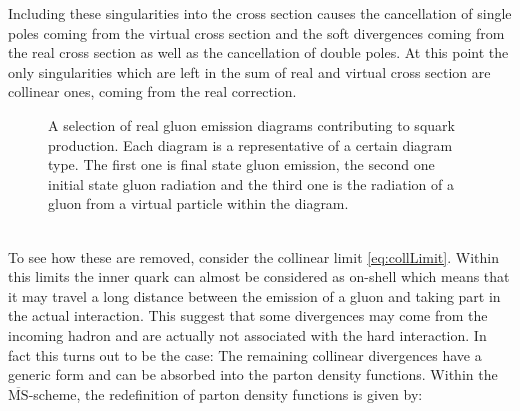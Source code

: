Including these singularities into the cross section causes the cancellation of single poles coming from the virtual cross section and the soft divergences coming from the real cross section as well as the cancellation of double poles. At this point the only singularities which are left in the sum of real and virtual cross section are collinear ones, coming from the real correction.
\begin{figure}[!htbp]
\begin{center}
\caption{A selection of real gluon emission diagrams contributing to squark production. Each diagram is a representative of a certain diagram type. The first one is final state gluon emission, the second one initial state gluon radiation and the third one is the radiation of a gluon from a virtual particle within the diagram.}\label{fig:RealGluon}
\end{center}
\end{figure}\\
To see how these are removed, consider the collinear limit \eqref{eq:collLimit}. Within this limits the inner quark can almost be considered as on-shell which means that it may travel a long distance between the emission of a gluon and taking part in the actual interaction. This suggest that some divergences may come from the incoming hadron and are actually not associated with the hard interaction. In fact this turns out to be the case: The remaining collinear divergences have a generic form and can be absorbed into the parton density functions. Within the $\overline{\mathrm{MS}}$-scheme, the redefinition of parton density functions is given by:\cite{Harris:2001sx}
